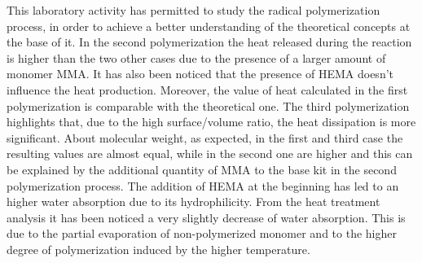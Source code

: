 \documentclass[a4paper, 11pt]{article}
\begin{document}
This laboratory activity has permitted to study the radical polymerization process, in order to achieve a better understanding of the theoretical concepts at the base of it.
In the second polymerization the heat released during the reaction is higher than the two other cases due to the presence of a larger amount of monomer MMA. It has also been noticed that the presence of HEMA doesn't influence the heat production. Moreover, the value of heat calculated in the first polymerization is comparable with the theoretical one. The third polymerization highlights that, due to the high surface/volume ratio, the heat dissipation is more significant. About molecular weight, as expected, in the first and third case the resulting values are almost equal, while in the second one are higher and this can be explained by the additional quantity of MMA to the base kit in the second polymerization process. The addition of HEMA at the beginning has led to an higher water absorption due to its hydrophilicity. From the heat treatment analysis it has been noticed a very slightly decrease of water absorption. This is due to the partial evaporation of non-polymerized monomer and to the higher degree of polymerization induced by the higher temperature.

\newpage
\end{document}
